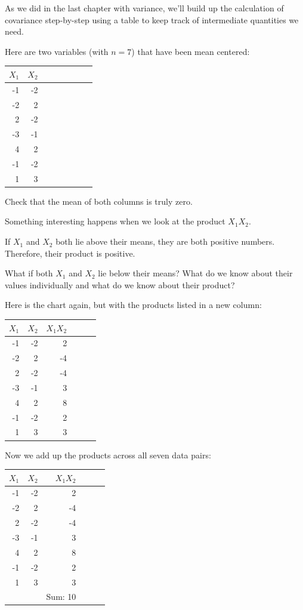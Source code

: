 \documentclass[
]{book}
\begin{document}
As we did in the last chapter with variance, we'll build up the calculation of covariance step-by-step using a table to keep track of intermediate quantities we need.

Here are two variables (with \(n = 7\)) that have been mean centered:

\begin{longtable}[]{@{}rrll@{}}
\toprule
\(X_{1}\) & \(X_{2}\) & \(\qquad\) & \(\qquad\) \\
\midrule
\endhead
-1 & -2 & & \\
-2 & 2 & & \\
2 & -2 & & \\
-3 & -1 & & \\
4 & 2 & & \\
-1 & -2 & & \\
1 & 3 & & \\
\bottomrule
\end{longtable}

Check that the mean of both columns is truly zero.

Something interesting happens when we look at the product \(X_{1}X_{2}\).

If \(X_{1}\) and \(X_{2}\) both lie above their means, they are both positive numbers. Therefore, their product is positive.

What if both \(X_{1}\) and \(X_{2}\) lie below their means? What do we know about their values individually and what do we know about their product?

Here is the chart again, but with the products listed in a new column:

\begin{longtable}[]{@{}rrrl@{}}
\toprule
\(X_{1}\) & \(X_{2}\) & \(X_{1}X_{2}\) & \(\qquad\) \\
\midrule
\endhead
-1 & -2 & 2 & \\
-2 & 2 & -4 & \\
2 & -2 & -4 & \\
-3 & -1 & 3 & \\
4 & 2 & 8 & \\
-1 & -2 & 2 & \\
1 & 3 & 3 & \\
\bottomrule
\end{longtable}

Now we add up the products across all seven data pairs:

\begin{longtable}[]{@{}rrrl@{}}
\toprule
\(X_{1}\) & \(X_{2}\) & \(X_{1}X_{2}\) & \(\qquad\) \\
\midrule
\endhead
-1 & -2 & 2 & \\
-2 & 2 & -4 & \\
2 & -2 & -4 & \\
-3 & -1 & 3 & \\
4 & 2 & 8 & \\
-1 & -2 & 2 & \\
1 & 3 & 3 & \\
& & Sum: 10 & \\
\bottomrule
\end{longtable}
\end{document}

